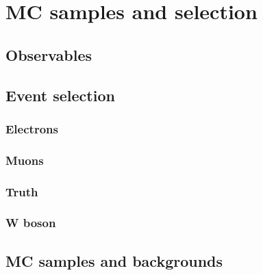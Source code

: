 \chapter{MC samples and selection}
    
    
    \section{Observables}
    \subsection{}
     
     \section{Event selection}
     \subsection{Electrons}
     \subsection{Muons}
     \subsection{Truth}
     \subsection{W boson}
      \section{MC samples and backgrounds}
     